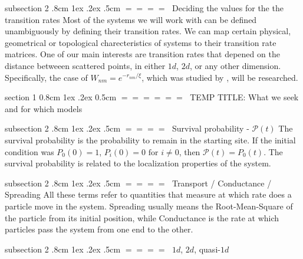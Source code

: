 \documentclass[onecolumn,fleqn,notitlepage,secnumarabic]{revtex4}
\makeatletter
\def\section{%
  \@startsection
    {section}%
    {1}%
    {\z@}%
    {0.8cm \@plus1ex \@minus .2ex}%
    {0.5cm}%
    {\Large\bf $=\!=\!=\!=\!=\!=\;$}%
}%
\def\subsection{%
  \@startsection
    {subsection}%
    {2}%
    {\z@}%
    {.8cm \@plus1ex \@minus .2ex}%
    {.5cm}%
    {\normalfont\small\bfseries$=\!=\!=\!=\;$}%
}%
\makeatother
\begin{document}
\subsection{Deciding the values for the the transition rates}
Most of the systems we will work with can be defined unambiguously by defining their transition rates. We can map certain physical, geometrical or topological charecteristics of systems to their transition rate matrices. One of our main interests are transition rates that depened on the distance betweeen scattered points, in either $1d$, $2d$, or any other dimension. Specifically, the case of $W_{nm}= e^{-r_{nm}/ \xi}$, which was studied by \citet{Amir:2010:PRL}, will be researched.

\section{TEMP TITLE: What we seek and for which models}

\subsection{Survival probability - $\mathcal{P}(t)$} 
The survival probability is the probability to remain in the starting site. If the initial condition was $P_0(0)=1$, $P_i(0)=0 \textrm{  for  } i\neq 0$, then $\mathcal{P}(t)= P_0(t)$. The survival probability is related to the localization properties of the system.

\subsection{Transport / Conductance / Spreading}
All these terms refer to quantities that measure at which rate does a particle move in the system. Spreading usually means the Root-Mean-Square of the particle from its initial position, while Conductance is the rate at which particles pass the system from one end to the other.

\subsection{$1d$, $2d$, quasi-$1d$}

\end{document}

